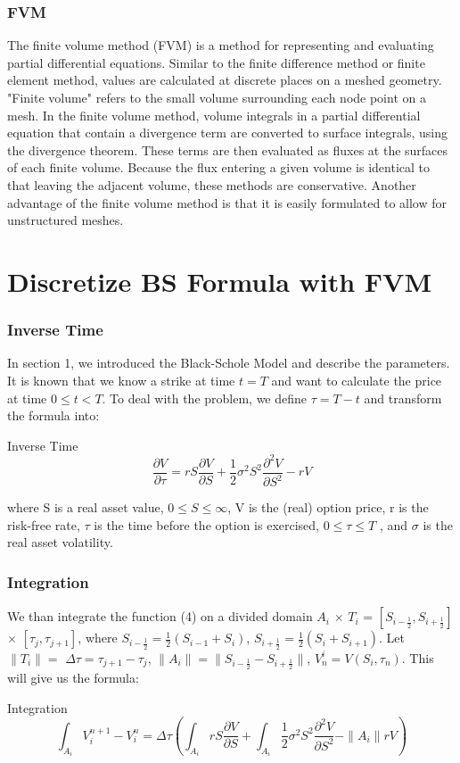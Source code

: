 \documentclass[blue]{beamer}
\begin{document}
\begin{frame}
\frametitle{FVM}
The finite volume method (FVM) is a method for representing and evaluating partial differential equations\cite{patankar1980numerical,leveque2002FVM}. Similar to the finite difference method or finite element method, values are calculated at discrete places on a meshed geometry. "Finite volume" refers to the small volume surrounding each node point on a mesh. In the finite volume method, volume integrals in a partial differential equation that contain a divergence term are converted to surface integrals, using the divergence theorem. These terms are then evaluated as fluxes at the surfaces of each finite volume. Because the flux entering a given volume is identical to that leaving the adjacent volume, these methods are conservative. Another advantage of the finite volume method is that it is easily formulated to allow for unstructured meshes. \cite{versteeg2007FVM} 
\end{frame}

\section{Discretize BS Formula with FVM}
\begin{frame}
\frametitle{Inverse Time}
In section 1, we introduced the Black-Schole Model and describe the parameters. It is known that we know a strike at time $t=T$ and want to calculate the price at time $0 \leq t<T$. To deal with the problem, we define $\tau = T-t$ and transform the formula into:
\begin{block}{Inverse Time}
\begin{equation}
\frac{\partial V}{\partial \tau}=rS \frac{\partial V}{\partial S}+\frac{1}{2} \sigma ^2 S^2 \frac{\partial ^2 V}{\partial S ^2}-rV
\end{equation}
\end{block}
where S is a real asset value, $0 \leq S \leq \infty$, V is the (real) option price, r is the risk-free rate, $\tau$ is the time before the option is
exercised, $0 \leq \tau \leq T$ , and $\sigma$ is the real asset volatility.  \\
\end{frame}
\begin{frame}
\frametitle{Integration}
We than integrate the function (4) on a divided domain $ A_i$ $ \times$ $T_i$ = $[S_{i-\frac{1}{2}},S_{i+\frac{1}{2}}]$ $\times$ $[\tau_j , \tau_{j+1}]$, where $S_{i-\frac{1}{2}}= \frac{1}{2} (S_{i-1}+S_{i})$, $S_{i+\frac{1}{2}}=\frac{1}{2} (S_{i}+S_{i+1})$. Let $\|T_i\|=$ $\Delta \tau=\tau_{j+1}-\tau_{j}$, $\|A_i\|= \|S_{i-\frac{1}{2}}-S_{i+\frac{1}{2}}\| $, $V_n^i=V(S _i, \tau _n)$. This will give us the formula:
\begin{block}{Integration}
\begin{equation}
\int _{A_i} V_i^{n+1}- V_i^{n}= \Delta \tau (\int _{A_i} rS \frac{\partial V}{\partial S}+ \int _{A_i} \frac{1}{2} \sigma ^2 S^2 \frac{\partial ^2 V}{\partial S ^2}- \|A_i\| rV)
\end{equation}
\end{block}
\end{frame}
\end{document}
